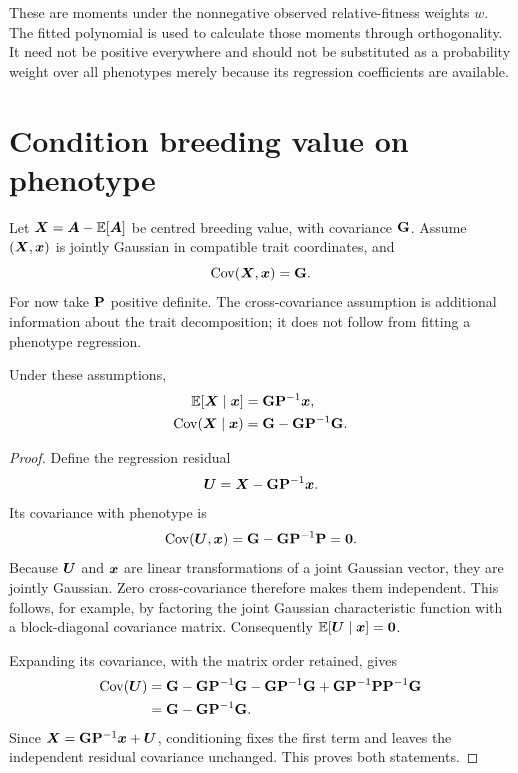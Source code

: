 These are moments under the nonnegative observed relative-fitness weights
\(w\). The fitted polynomial is used to calculate those moments through
orthogonality. It need not be positive everywhere and should not be
substituted as a probability weight over all phenotypes merely because its
regression coefficients are available.

\section{Condition breeding value on phenotype}
\label{conversion:conditioning}

Let \(\boldsymbol{X}=\boldsymbol{A}-\mathbb E[\boldsymbol{A}]\) be centred breeding value, with covariance
\(\mathbf{G}\). Assume \((\boldsymbol{X},\boldsymbol{x})\) is jointly Gaussian in compatible
trait coordinates, and
\begin{equation}
 \operatorname{Cov}(\boldsymbol{X},\boldsymbol{x})=\mathbf{G}.
 \label{conversion:cross_covariance}
\end{equation}
For now take \(\mathbf{P}\) positive definite. The cross-covariance assumption is
additional information about the trait decomposition; it does not follow
from fitting a phenotype regression.

\begin{proposition}
\label{conversion:conditional_moments}
Under these assumptions,
\begin{align}
 \mathbb E[\boldsymbol{X}\mid\boldsymbol{x}]&=\mathbf{G}\mathbf{P}^{-1}\boldsymbol{x},\nonumber\\
 \operatorname{Cov}(\boldsymbol{X}\mid\boldsymbol{x})
 &=\mathbf{G}-\mathbf{G}\mathbf{P}^{-1}\mathbf{G}.
 \label{conversion:conditional_formula}
\end{align}
\end{proposition}

\begin{proof}
Define the regression residual
\[
 \boldsymbol{U}=\boldsymbol{X}-\mathbf{G}\mathbf{P}^{-1}\boldsymbol{x}.
\]
Its covariance with phenotype is
\[
 \operatorname{Cov}(\boldsymbol{U},\boldsymbol{x})
 =\mathbf{G}-\mathbf{G}\mathbf{P}^{-1}\mathbf{P}=\mathbf{0}.
\]
Because \(\boldsymbol{U}\) and \(\boldsymbol{x}\) are linear transformations of a joint
Gaussian vector, they are jointly Gaussian. Zero cross-covariance therefore
makes them independent. This follows, for example, by factoring the joint
Gaussian characteristic function with a block-diagonal covariance matrix.
Consequently \(\mathbb E[\boldsymbol{U}\mid\boldsymbol{x}]=\boldsymbol{0}\).

Expanding its covariance, with the matrix order retained, gives
\begin{align*}
 \operatorname{Cov}(\boldsymbol{U})
 &=\mathbf{G}-\mathbf{G}\mathbf{P}^{-1}\mathbf{G}
       -\mathbf{G}\mathbf{P}^{-1}\mathbf{G}
       +\mathbf{G}\mathbf{P}^{-1}\mathbf{P}\mathbf{P}^{-1}\mathbf{G}\\
 &=\mathbf{G}-\mathbf{G}\mathbf{P}^{-1}\mathbf{G}.
\end{align*}
Since \(\boldsymbol{X}=\mathbf{G}\mathbf{P}^{-1}\boldsymbol{x}+\boldsymbol{U}\), conditioning fixes the
first term and leaves the independent residual covariance unchanged. This
proves both statements.
\end{proof}


